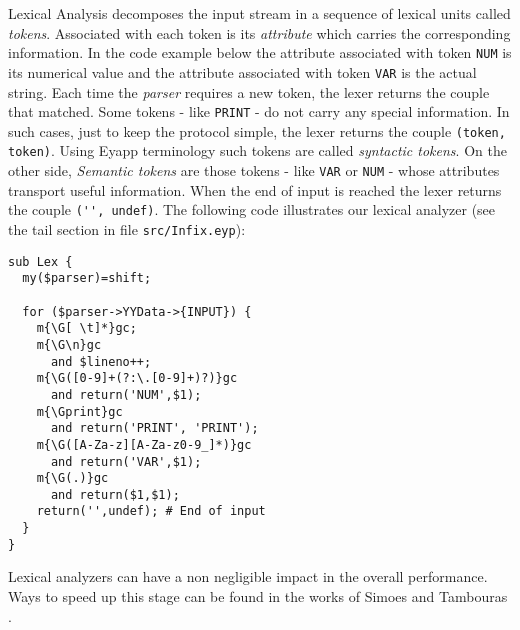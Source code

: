 Lexical Analysis decomposes the input stream in a 
sequence of lexical units called \emph{tokens}.
Associated with each token is its \emph{attribute}
which carries the corresponding information.
In the code example below
the attribute associated with token \verb|NUM|
is its numerical value and the attribute associated with 
token \verb|VAR| is the actual string.
Each time the \emph{parser}
requires a new token, the lexer returns
the couple  that matched.
Some tokens - like \verb|PRINT| -  do not carry any special
information. In such cases, just to keep the protocol
simple, the lexer returns the couple \verb|(token, token)|.
Using Eyapp terminology such tokens are called \emph{syntactic tokens}.
On the other side, \emph{Semantic tokens} are those tokens - like \verb|VAR|
or \verb|NUM| - whose attributes transport 
useful information. When the end of input is reached the lexer
returns the couple \verb|('', undef)|.
The following code illustrates our lexical analyzer (see
the tail section in file \verb|src/Infix.eyp|):

\begin{verbatim}
sub Lex {
  my($parser)=shift; 
  
  for ($parser->YYData->{INPUT}) { 
    m{\G[ \t]*}gc;
    m{\G\n}gc                      
      and $lineno++;
    m{\G([0-9]+(?:\.[0-9]+)?)}gc   
      and return('NUM',$1);
    m{\Gprint}gc                   
      and return('PRINT', 'PRINT');
    m{\G([A-Za-z][A-Za-z0-9_]*)}gc 
      and return('VAR',$1);
    m{\G(.)}gc                     
      and return($1,$1);
    return('',undef); # End of input
  }
}
\end{verbatim}
%

Lexical analyzers can have a non negligible impact in 
the overall performance. Ways to speed up this stage can be found 
in the works of Simoes \cite{simoes} and Tambouras \cite{Tambouras}.
